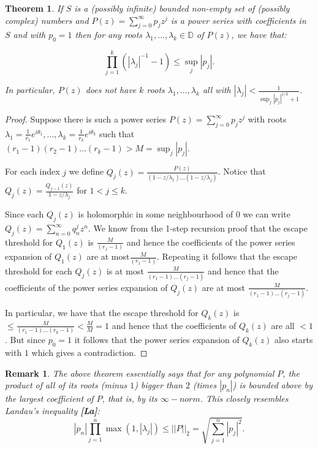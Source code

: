 \documentclass[11pt]{amsart}
\newtheorem{theorem}{Theorem}
\newtheorem*{remark}{Remark}
\numberwithin{theorem}{section} %
\numberwithin{corollary}{section}
\numberwithin{lemma}{section}
\numberwithin{proposition}{section}
\numberwithin{definition}{section}
\begin{document}
\begin{theorem}
\label{prod ineq}
If $S$ is a (possibly infinite) bounded non-empty set of (possibly complex) numbers and $P(z) = \sum_{j=0}^\infty p_jz^j$ is a power series with coefficients in $S$ and with $p_0 =1$ then for any roots $\lambda_1, ..., \lambda_k \in \mathbb{D}$ of $P(z)$, we have that:

$$\prod_{j=1}^k (|\lambda_j|^{-1} - 1) \leqslant \sup_j |p_j|.$$

In particular, $P(z)$ does not have $k$ roots $\lambda_1, ..., \lambda_k$ all with $|\lambda_j| < \frac{1}{\sup_j|p_j|^{1/k} + 1}$.

\end{theorem}

\begin{proof}
Suppose there is such a power series $P(z) = \sum_{j=0}^\infty p_jz^j$ with roots $\lambda_1 = \frac{1}{r_1}e^{i\theta_1}, ..., \lambda_k = \frac{1}{r_k}e^{i\theta_k}$ such that $(r_1-1)(r_2-1)...(r_k-1) > M = \sup_j |p_j|$.

For each index $j$ we define $Q_j(z) = \frac{P(z)}{(1-z/\lambda_1)...(1-z/\lambda_j)}$. Notice that $Q_j(z) = \frac{Q_{j-1}(z)}{1-z/\lambda_j}$ for $1 < j \leqslant k$.

Since each $Q_j(z)$ is holomorphic in some neighbourhood of $0$ we can write $Q_j(z) = \sum_{n=0}^\infty q_n^j z^n$. We know from the 1-step recursion proof that the escape threshold for $Q_1(z)$ is $\frac{M}{(r_1-1)}$ and hence the coefficients of the power series expansion of $Q_1(z)$ are at most$\frac{M}{(r_1-1)}$. Repeating it follows that the escape threshold for each $Q_j(z)$ is at most $\frac{M}{(r_1-1)...(r_j-1)}$ and hence that the coefficients of the power series expansion of $Q_j(z)$ are at most $\frac{M}{(r_1-1)...(r_j-1)}$.

In particular, we have that the escape threshold for $Q_k(z)$ is $\leqslant \frac{M}{(r_1-1)...(r_k-1)} < \frac{M}{M} = 1$ and hence that the coefficients of $Q_k(z)$ are all $<1$. But since $p_0 = 1$ it follows that the power series expansion of $Q_k(z)$ also starts with $1$ which gives a contradiction.
\end{proof}

\begin{remark}
The above theorem essentially says that for any polynomial $P$, the product of all of its roots (minus $1$) bigger than $2$ (times $|p_n|$) is bounded above by the largest coefficient of $P$, that is, by its $\infty-norm$. This closely resembles Landau's inequality \textbf{[La]}:
$$|p_n| \prod_{j=1}^n\max(1, |\lambda_j|) \leqslant ||P||_2 = \sqrt{\sum_{j=1}^n |p_j|^2}. $$
\end{remark}
\end{document}
